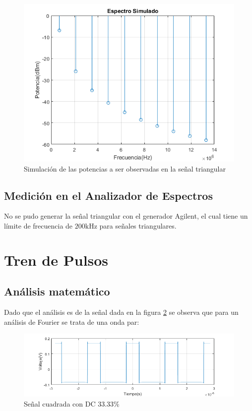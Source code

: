     \begin{figure}[ht]
        \begin{center}
            \includegraphics[width=0.7\linewidth]{contenido/img/spect_tri.png}
            \caption{Simulación de las potencias a ser observadas en la señal triangular}
            \label{fig:2,2,2}
        \end{center}
    \end{figure}

    \subsection{Medición en el Analizador de Espectros}

    No se pudo generar la señal triangular con el generador Agilent, el cual tiene un límite
    de frecuencia de $200\si{\kilo\hertz}$ para señales triangulares.

\section{Tren de Pulsos}
    \subsection{Análisis matemático}

    Dado que el análisis es de la señal dada en la figura \ref{fig:2,3,1}
    se observa que para un análisis de Fourier se trata de una onda
    par:

    \begin{figure}[ht]
        \begin{center}
            \includegraphics[width=\linewidth]{contenido/img/sig_sqr33.png}
            \caption{Señal cuadrada con DC 33.33\%}
            \label{fig:2,3,1}
        \end{center}
    \end{figure}

